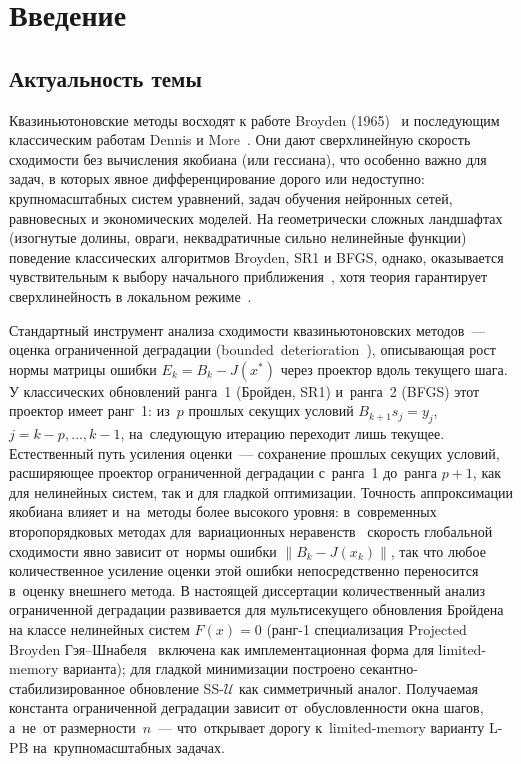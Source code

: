 
\chapter*{Введение}

\section*{Актуальность темы}

Квазиньютоновские методы восходят к работе Broyden (1965)~\cite{broyden1965}
и последующим классическим работам Dennis и More~\cite{dennis1977,dennis1996}.
Они дают сверхлинейную скорость сходимости без вычисления якобиана
(или гессиана), что особенно важно для задач, в которых явное
дифференцирование дорого или недоступно: крупномасштабных систем
уравнений, задач обучения нейронных сетей, равновесных и экономических
моделей. На геометрически сложных ландшафтах (изогнутые долины, овраги,
неквадратичные сильно нелинейные функции) поведение классических
алгоритмов Broyden, SR1 и BFGS, однако, оказывается чувствительным
к выбору начального
приближения~\cite{more1981,dennis1996,conn1991,shannophua1978}, хотя
теория гарантирует сверхлинейность в локальном
режиме~\cite{broyden1973,dennis1974}.

Стандартный инструмент анализа сходимости квазиньютоновских
методов~--- оценка ограниченной деградации
(bounded~deterioration~\cite{broyden1973,dennis1996}), описывающая
рост нормы матрицы ошибки $E_k = B_k - J(x^*)$ через проектор вдоль
текущего шага. У классических обновлений ранга~1 (Бройден, SR1)
и~ранга~2 (BFGS) этот проектор имеет ранг~1: из~$p$ прошлых секущих
условий $B_{k+1}s_j = y_j$, $j = k{-}p,\ldots,k{-}1$, на~следующую
итерацию переходит лишь текущее. Естественный путь усиления
оценки~--- сохранение прошлых секущих условий, расширяющее проектор
ограниченной деградации с~ранга~1 до~ранга $p{+}1$, как для нелинейных
систем, так и для гладкой оптимизации. Точность аппроксимации якобиана
влияет и~на~методы более высокого уровня: в~современных
второпорядковых методах для~вариационных неравенств~\cite{viqa2024}
скорость глобальной сходимости явно зависит от~нормы ошибки
$\|B_k - J(x_k)\|$, так что любое количественное усиление оценки этой
ошибки непосредственно переносится в~оценку внешнего метода. В
настоящей диссертации количественный анализ ограниченной деградации
развивается для мультисекущего обновления Бройдена~\cite{schnabel1983}
на классе нелинейных систем $F(x) = 0$ (ранг-1 специализация
Projected Broyden Гэя--Шнабеля~\cite{gay_schnabel1978} включена как
имплементационная форма для limited-memory варианта); для гладкой
минимизации построено секантно-стабилизированное обновление
SS-$\mathcal{U}$ как симметричный аналог. Получаемая константа
ограниченной деградации зависит от~обусловленности окна шагов,
а~не~от размерности~$n$~--- что~открывает дорогу к~limited-memory
варианту L-PB на~крупномасштабных задачах.

